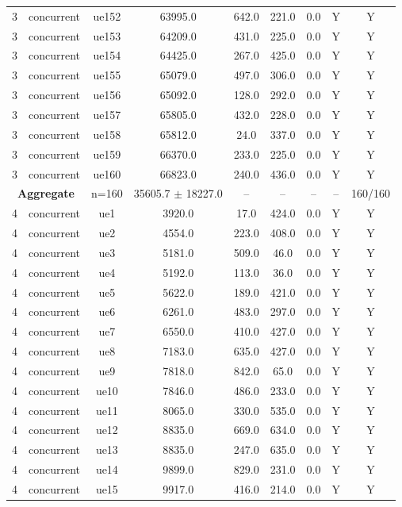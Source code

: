\begin{table}[ht]
\begin{tabular}{|c|c|c|c|c|c|c|c|c|}
3 & concurrent & ue152 & 63995.0 & 642.0 & 221.0 & 0.0 & Y & Y \\
3 & concurrent & ue153 & 64209.0 & 431.0 & 225.0 & 0.0 & Y & Y \\
3 & concurrent & ue154 & 64425.0 & 267.0 & 425.0 & 0.0 & Y & Y \\
3 & concurrent & ue155 & 65079.0 & 497.0 & 306.0 & 0.0 & Y & Y \\
3 & concurrent & ue156 & 65092.0 & 128.0 & 292.0 & 0.0 & Y & Y \\
3 & concurrent & ue157 & 65805.0 & 432.0 & 228.0 & 0.0 & Y & Y \\
3 & concurrent & ue158 & 65812.0 & 24.0 & 337.0 & 0.0 & Y & Y \\
3 & concurrent & ue159 & 66370.0 & 233.0 & 225.0 & 0.0 & Y & Y \\
3 & concurrent & ue160 & 66823.0 & 240.0 & 436.0 & 0.0 & Y & Y \\
\multicolumn{2}{|c|}{\textbf{Aggregate}} & n=160 & 35605.7 $\pm$ 18227.0 & -- & -- & -- & -- & 160/160 \\
\hline
4 & concurrent & ue1 & 3920.0 & 17.0 & 424.0 & 0.0 & Y & Y \\
4 & concurrent & ue2 & 4554.0 & 223.0 & 408.0 & 0.0 & Y & Y \\
4 & concurrent & ue3 & 5181.0 & 509.0 & 46.0 & 0.0 & Y & Y \\
4 & concurrent & ue4 & 5192.0 & 113.0 & 36.0 & 0.0 & Y & Y \\
4 & concurrent & ue5 & 5622.0 & 189.0 & 421.0 & 0.0 & Y & Y \\
4 & concurrent & ue6 & 6261.0 & 483.0 & 297.0 & 0.0 & Y & Y \\
4 & concurrent & ue7 & 6550.0 & 410.0 & 427.0 & 0.0 & Y & Y \\
4 & concurrent & ue8 & 7183.0 & 635.0 & 427.0 & 0.0 & Y & Y \\
4 & concurrent & ue9 & 7818.0 & 842.0 & 65.0 & 0.0 & Y & Y \\
4 & concurrent & ue10 & 7846.0 & 486.0 & 233.0 & 0.0 & Y & Y \\
4 & concurrent & ue11 & 8065.0 & 330.0 & 535.0 & 0.0 & Y & Y \\
4 & concurrent & ue12 & 8835.0 & 669.0 & 634.0 & 0.0 & Y & Y \\
4 & concurrent & ue13 & 8835.0 & 247.0 & 635.0 & 0.0 & Y & Y \\
4 & concurrent & ue14 & 9899.0 & 829.0 & 231.0 & 0.0 & Y & Y \\
4 & concurrent & ue15 & 9917.0 & 416.0 & 214.0 & 0.0 & Y & Y \\

\end{tabular}
\end{table}
